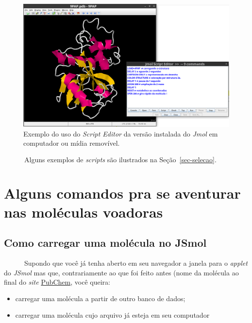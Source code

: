 \documentclass[
  letterpaper,
  DIV=11,
  numbers=noendperiod]{scrreprt}
\providecommand{\tightlist}{%
  \setlength{\itemsep}{0pt}\setlength{\parskip}{0pt}}\usepackage{longtable,booktabs,array}
\begin{document}
\begin{figure}[H]

{\centering \includegraphics{scriptEditor.png}

}

\caption{Exemplo do uso do \emph{Script Editor} da versão instalada do
\emph{Jmol} em computador ou mídia removível.}

\end{figure}%

~~~~~~Alguns exemplos de \emph{scripts} são ilustrados na
Seção~\ref{sec-selecao}.


\chapter{Alguns comandos pra se aventurar nas moléculas
voadoras}\label{alguns-comandos-pra-se-aventurar-nas-moluxe9culas-voadoras}

\section{Como carregar uma molécula no
JSmol}\label{como-carregar-uma-moluxe9cula-no-jsmol}

~~~~~~Supondo que você já tenha aberto em seu navegador a janela para o
\emph{applet} do \emph{JSmol} mas que, contrariamente ao que foi feito
antes (nome da molécula ao final do \emph{site}
\href{https://pubchem.ncbi.nlm.nih.gov/}{PubChem}, você queira:

\begin{itemize}
\tightlist
\item
  carregar uma molécula a partir de outro banco de dados;
\item
  carregar uma molécula cujo arquivo já esteja em seu computador
\end{itemize}
\end{document}
